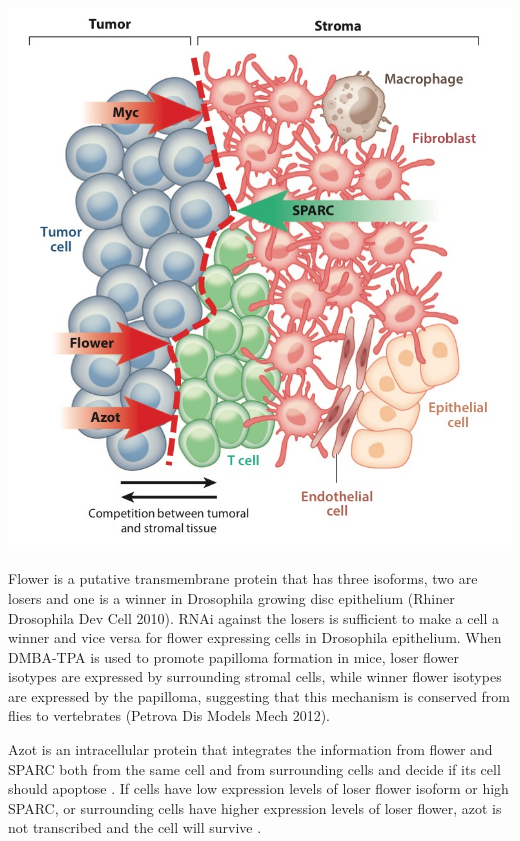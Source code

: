 \documentclass[]{book}
\newenvironment{Shaded}{\begin{snugshade}}{\end{snugshade}}
\newcommand{\KeywordTok}[1]{\textcolor[rgb]{0.13,0.29,0.53}{\textbf{#1}}}
\newcommand{\DataTypeTok}[1]{\textcolor[rgb]{0.13,0.29,0.53}{#1}}
\newcommand{\DecValTok}[1]{\textcolor[rgb]{0.00,0.00,0.81}{#1}}
\newcommand{\OtherTok}[1]{\textcolor[rgb]{0.56,0.35,0.01}{#1}}
\newcommand{\OperatorTok}[1]{\textcolor[rgb]{0.81,0.36,0.00}{\textbf{#1}}}
\newcommand{\NormalTok}[1]{#1}
\begin{document}
\includegraphics{images/04-1.jpg}

\begin{Shaded}
\end{Shaded}

Flower is a putative transmembrane protein that has three isoforms, two
are losers and one is a winner in Drosophila growing disc epithelium
(Rhiner Drosophila Dev Cell 2010). RNAi against the losers is sufficient
to make a cell a winner and vice versa for flower expressing cells in
Drosophila epithelium. When DMBA-TPA is used to promote papilloma
formation in mice, loser flower isotypes are expressed by surrounding
stromal cells, while winner flower isotypes are expressed by the
papilloma, suggesting that this mechanism is conserved from flies to
vertebrates (Petrova Dis Models Mech 2012).

Azot is an intracellular protein that integrates the information from
flower and SPARC both from the same cell and from surrounding cells and
decide if its cell should apoptose \citep{petrova2011expression}. If
cells have low expression levels of loser flower isoform or high SPARC,
or surrounding cells have higher expression levels of loser flower, azot
is not transcribed and the cell will survive
\citep{merino2015elimination}.
\end{document}
